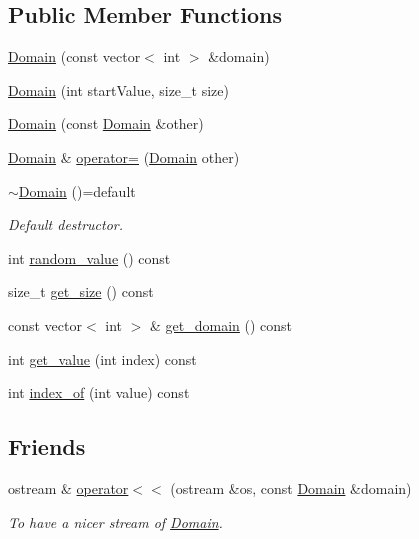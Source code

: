 \subsection*{Public Member Functions}
\begin{DoxyCompactItemize}
\item 
\hyperlink{classghost_1_1Domain_adbdf32b7d0129175ec320f4b7c10132e}{Domain} (const vector$<$ int $>$ \&domain)
\item 
\hyperlink{classghost_1_1Domain_aa1ab4810892cfb627be69593c48fa68c}{Domain} (int start\+Value, size\+\_\+t size)
\item 
\hyperlink{classghost_1_1Domain_ae2419e072b48d1aaa5e9aedc36babbb6}{Domain} (const \hyperlink{classghost_1_1Domain}{Domain} \&other)
\item 
\hyperlink{classghost_1_1Domain}{Domain} \& \hyperlink{classghost_1_1Domain_a69c6fb58d1811b8306d1dc8b0aaa6778}{operator=} (\hyperlink{classghost_1_1Domain}{Domain} other)
\item 
\hyperlink{classghost_1_1Domain_aa5d4791c2f90c021d9f19746f4694039}{$\sim$\+Domain} ()=default
\begin{DoxyCompactList}\small\item\em Default destructor. \end{DoxyCompactList}\item 
int \hyperlink{classghost_1_1Domain_a5d12f840be7a0ddd673c85d70426a75e}{random\+\_\+value} () const 
\item 
size\+\_\+t \hyperlink{classghost_1_1Domain_a222990a926a5313aef33025d48b41712}{get\+\_\+size} () const 
\item 
const vector$<$ int $>$ \& \hyperlink{classghost_1_1Domain_af14587da3669db692a9b988cc240999a}{get\+\_\+domain} () const 
\item 
int \hyperlink{classghost_1_1Domain_a6e50fc11a5ed2857fccb69f12c0fa07d}{get\+\_\+value} (int index) const 
\item 
int \hyperlink{classghost_1_1Domain_a1201d3b7c15381d19510a131d8823ff0}{index\+\_\+of} (int value) const 
\end{DoxyCompactItemize}
\subsection*{Friends}
\begin{DoxyCompactItemize}
\item 
ostream \& \hyperlink{classghost_1_1Domain_a608c9910828eb2983efb65ff4c297a4e}{operator$<$$<$} (ostream \&os, const \hyperlink{classghost_1_1Domain}{Domain} \&domain)
\begin{DoxyCompactList}\small\item\em To have a nicer stream of \hyperlink{classghost_1_1Domain}{Domain}. \end{DoxyCompactList}\end{DoxyCompactItemize}



